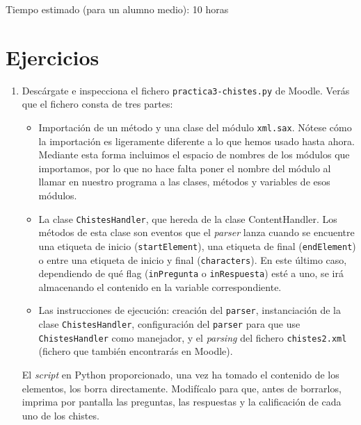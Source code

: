 \documentclass[11pt,a4paper]{article}
\newcommand{\finejercicio}{
  \begin{footnotesize}
    [Al terminar el ejercicio es recomendable hacer \texttt{commit} de los ficheros modificados]
  \end{footnotesize}
}
\begin{document}
Tiempo estimado (para un alumno medio): 10 horas

\section{Ejercicios}

\begin{enumerate}

  \item Descárgate e inspecciona el fichero \texttt{practica3-chistes.py} de Moodle. Verás que el fichero consta de tres partes:
  \begin{itemize}
    \item Importación de un método y una clase del módulo \texttt{xml.sax}. Nótese cómo la importación es ligeramente diferente a lo que hemos usado hasta ahora. Mediante esta forma incluimos el espacio de nombres de los módulos que importamos, por lo que no hace falta poner el nombre del módulo al llamar en nuestro programa a las clases, métodos y variables de esos módulos.
    \item La clase \texttt{ChistesHandler}, que hereda de la clase ContentHandler. Los métodos de esta clase son eventos que el \emph{parser} lanza cuando se encuentre una etiqueta de inicio (\texttt{startElement}), una etiqueta de final (\texttt{endElement}) o entre una etiqueta de inicio y final (\texttt{characters}). En este último caso, dependiendo de qué flag (\texttt{inPregunta} o \texttt{inRespuesta}) esté a uno, se irá almacenando el contenido en la variable correspondiente.
    \item Las instrucciones de ejecución: creación del \texttt{parser}, instanciación de la clase \texttt{ChistesHandler}, configuración del \texttt{parser} para que use \texttt{ChistesHandler} como manejador, y el \emph{parsing} del fichero \texttt{chistes2.xml} (fichero que también encontrarás en Moodle).
  \end{itemize}

El \emph{script} en Python proporcionado, una vez ha tomado el contenido de los elementos, los borra directamente. Modifícalo para que, antes de borrarlos, imprima por pantalla las preguntas, las respuestas y la calificación de cada uno de los chistes.




\end{enumerate}
\end{document}
